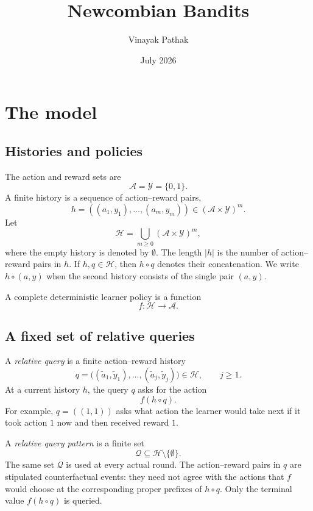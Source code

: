 \documentclass[11pt]{article}
\title{Newcombian Bandits}
\author{Vinayak Pathak}
\date{July 2026}
\newcommand{\A}{\mathcal A}
\newcommand{\Y}{\mathcal Y}
\newcommand{\Hh}{\mathcal H}
\newcommand{\QQ}{\mathcal Q}
\begin{document}
\maketitle

\section{The model}

\subsection{Histories and policies}

The action and reward sets are
\[
    \A=\Y=\{0,1\}.
\]
A finite history is a sequence of action--reward pairs,
\[
    h=((a_1,y_1),\ldots,(a_m,y_m))\in (\A\times\Y)^m.
\]
Let
\[
    \Hh=\bigcup_{m\geq 0}(\A\times\Y)^m,
\]
where the empty history is denoted by $\emptyset$.  The length $|h|$ is the number of action--reward pairs in $h$.  If $h,q\in\Hh$, then $h\circ q$ denotes their concatenation.  We write $h\circ(a,y)$ when the second history consists of the single pair $(a,y)$.

A complete deterministic learner policy is a function
\[
    f:\Hh\to\A.
\]

\subsection{A fixed set of relative queries}

A \emph{relative query} is a finite action--reward history
\[
    q=\bigl((\tilde a_1,\tilde y_1),\ldots,
            (\tilde a_j,\tilde y_j)\bigr)\in\Hh,
    \qquad j\geq 1.
\]
At a current history $h$, the query $q$ asks for the action
\[
    f(h\circ q).
\]
For example, $q=((1,1))$ asks what action the learner would take next if it took action $1$ now and then received reward $1$.

A \emph{relative query pattern} is a finite set
\[
    \QQ\subseteq\Hh\setminus\{\emptyset\}.
\]
The same set $\QQ$ is used at every actual round.  The action--reward pairs in $q$ are stipulated counterfactual events: they need not agree with the actions that $f$ would choose at the corresponding proper prefixes of $h\circ q$.  Only the terminal value $f(h\circ q)$ is queried.
\end{document}
